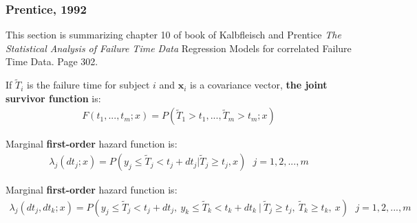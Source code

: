 \documentclass[]{article}
\begin{document}
\subsubsection{Prentice, 1992 \cite{prentice1992covariance}}
This section is summarizing chapter 10 of book of Kalbfleisch and Prentice \emph{The Statistical Analysis of Failure Time Data} \cite{kalbfleisch2011statistical} Regression Models for correlated Failure Time Data. Page 302.

If $\tilde{T}_i$ is the failure time for subject $i$ and $\pmb{x}_i$ is a covariance vector, \textbf{the joint survivor function} is:
	$$
	\begin{aligned}
		F(t_1,...,t_m;x) = P(\tilde{T}_1>t_1,...,\tilde{T}_m > t_m;x)
	\end{aligned}
	$$

Marginal \textbf{first-order }hazard function is:
	$$
	\begin{aligned}
		 \lambda_j(dt_j;x) = P(y_j\leq \tilde{T}_j<t_j + dt_j|\tilde{T}_j \geq t_j,x) ~~~j=1,2,...,m
	\end{aligned}
	$$

Marginal \textbf{first-order }hazard function is:
	$$
	\begin{aligned}
		 \lambda_j(dt_j,dt_k;x) = P(y_j\leq \tilde{T}_j<t_j + dt_j,~y_k\leq \tilde{T}_k<t_k + dt_k~|~\tilde{T}_j \geq t_j,~\tilde{T}_k \geq t_k,~x) ~~~j=1,2,...,m
	\end{aligned}
	$$
\end{document}
